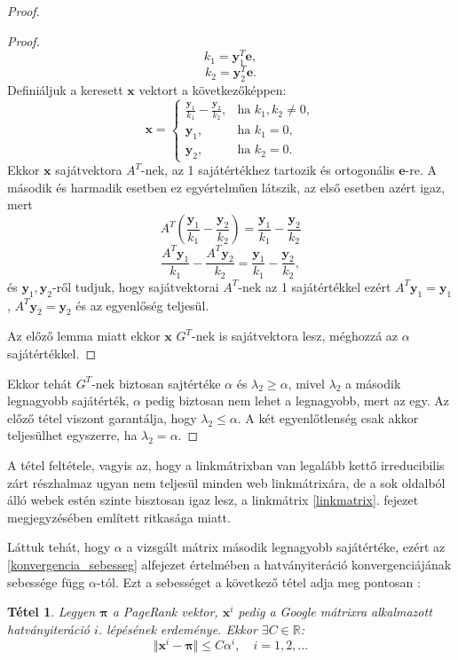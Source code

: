 \documentclass[12pt,a4paper]{article}
\newcommand{\bx}{\mathbf{x}}
\newcommand{\be}{\mathbf{e}}
\newcommand{\by}{\mathbf{y}}
\newtheorem{tetel}{Tétel}
\begin{document}
\begin{proof}
\begin{proof}
		\[ k_1 = \by_1^T \be, \]
		\[ k_2 = \by_2^T \be. \]
		Definiáljuk a keresett $\bx$ vektort a következőképpen:
		\begin{equation*}
		\bx=\begin{cases}
		\frac{\by_1}{k_1} - \frac{\by_2}{k_2}, & \text{ha $k_1,k_2 \neq 0$},\\
		\by_1, & \text{ha $k_1 = 0$}, \\
		\by_2, & \text{ha $k_2 = 0$}. 
		\end{cases}
		\end{equation*}
		\noindent
		Ekkor $\bx$ sajátvektora $A^T$-nek, az 1 sajátértékhez tartozik és ortogonális $\be$-re. A második és harmadik esetben ez egyértelműen látszik, az első esetben azért igaz, mert 
		\[ A^T (\frac{\by_1}{k_1} - \frac{\by_2}{k_2}) = \frac{\by_1}{k_1} - \frac{\by_2}{k_2} \] 
		\[ \frac{A^T \by_1}{k_1} - \frac{A^T \by_2}{k_2} = \frac{\by_1}{k_1} - \frac{\by_2}{k_2}, \]
		és $\by_1,\by_2$-ről tudjuk, hogy sajátvektorai $A^T$-nek az 1 sajátértékkel ezért $A^T \by_1 = \by_1$, $A^T \by_2 = \by_2$ és az egyenlőség teljesül. 
		
		Az előző lemma miatt ekkor $\bx$ $G^T$-nek is sajátvektora lesz, méghozzá az $\alpha$ sajátértékkel.  
	\end{proof} 

	Ekkor tehát $G^T$-nek biztosan sajtértéke $\alpha$ és $\lambda_2 \geq \alpha$, mivel $\lambda_2$ a második legnagyobb sajátérték, $\alpha$ pedig biztosan nem lehet a legnagyobb, mert az egy. Az előző tétel viszont garantálja, hogy $\lambda_2 \leq \alpha$. A két egyenlőtlenség csak akkor teljesülhet egyszerre, ha $\lambda_2 = \alpha$.
\end{proof}
\vspace{0.2cm}

A tétel feltétele, vagyis az, hogy a linkmátrixban van legalább kettő irreducibilis zárt részhalmaz ugyan nem teljesül minden web linkmátrixára, de a sok oldalból álló webek estén szinte bisztosan igaz lesz, a linkmátrix \ref{linkmatrix}. fejezet megjegyzésében említett ritkasága miatt.

Láttuk tehát, hogy $\alpha$ a vizsgált mátrix második legnagyobb sajátértéke, ezért az \ref{konvergencia_sebesseg} alfejezet értelmében a hatványiteráció konvergenciájának sebessége függ $\alpha$-tól. Ezt a sebességet a következő tétel adja meg pontosan \cite{convergence_speed}:

\begin{tetel}
	Legyen $\mathbf{\pi}$ a PageRank vektor, $\bx^i$ pedig a Google mátrixra alkalmazott hatványiteráció $i$. lépésének erdeménye. Ekkor $\exists C \in \mathbb{R}$:
	\[ \Vert \bx^i - \mathbf{\pi} \Vert \leq C \alpha^i, \quad i = 1,2,\ldots \]
\end{tetel}
\end{document}
